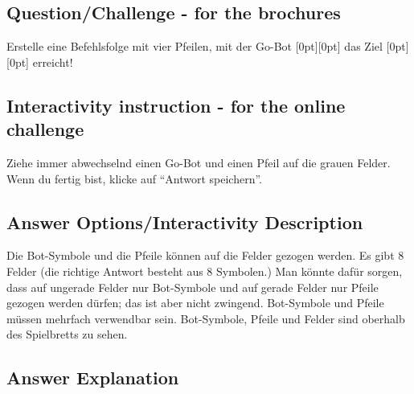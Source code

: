 \documentclass[a4paper,11pt]{report}
\newcommand{\taskGraphicsFolder}{..}
\begin{document}
{\em


\subsection*{Question/Challenge - for the brochures}

Erstelle eine Befehlsfolge mit vier Pfeilen, mit der Go-Bot \raisebox{-0.5ex}[0pt][0pt]{} das Ziel \raisebox{-0.5ex}[0pt][0pt]{} erreicht!

{\centering%
{\centering%
\par}

{\centering%
\par}\par}

}


\subsection*{Interactivity instruction - for the online challenge}

Ziehe immer abwechselnd einen Go-Bot und einen Pfeil auf die grauen Felder. Wenn du fertig bist, klicke auf \enquote{Antwort speichern}.

\begingroup
\renewcommand{\arraystretch}{1.5}
\subsection*{Answer Options/Interactivity Description}

Die Bot-Symbole und die Pfeile können auf die Felder gezogen werden.  Es gibt $8$ Felder (die richtige Antwort besteht aus $8$ Symbolen.)  Man könnte dafür sorgen, dass auf ungerade Felder nur Bot-Symbole und auf gerade Felder nur Pfeile gezogen werden dürfen; das ist aber nicht zwingend.  Bot-Symbole und Pfeile müssen mehrfach verwendbar sein.  Bot-Symbole, Pfeile und Felder sind oberhalb des Spielbretts zu sehen.

\endgroup

\subsection*{Answer Explanation}
\end{document}
